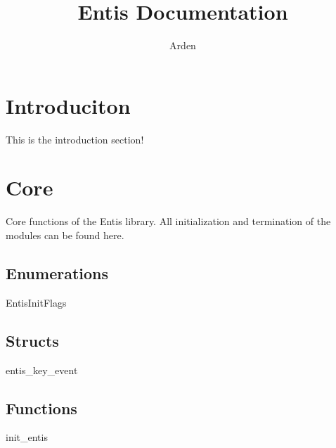 \documentclass{refdoc}
\title{Entis Documentation}
\author{Arden}
\begin{document}
\maketitle

\section{Introduciton}%
\label{sec:introduciton}

This is the introduction section!

\section{Core}%
\label{sec:core}

Core functions of the Entis library. All initialization and termination of the
modules can be found here.

\subsection{Enumerations}%
\label{sub:enumerations}

\begin{enum}{EntisInitFlags}
  \begin{enumerator}
  \end{enumerator}
\end{enum}

\subsection{Structs}%
\label{sub:structs}

\begin{struct}{entis\_key\_event}
  \begin{data}
  \end{data}
\end{struct}

\subsection{Functions}%
\label{sub:functions}

\begin{func}{init\_entis}
  \begin{params}
  \end{params}
\end{func}
\end{document}
